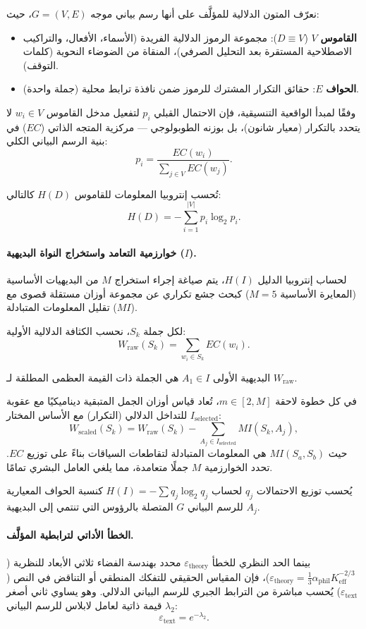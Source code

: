 \documentclass[11pt,a4paper]{article}
\begin{document}
	نعرّف المتون الدلالية للمؤلَّف على أنها رسم بياني موجه \(G = (V, E)\)، حيث:
	\begin{itemize}
		\item \textbf{القاموس} \(V\) (\(D \equiv V\)): مجموعة الرموز الدلالية الفريدة (الأسماء، الأفعال، والتراكيب الاصطلاحية المستقرة بعد التحليل الصرفي)، المنقاة من الضوضاء النحوية (كلمات التوقف).
		\item \textbf{الحواف} \(E\): حقائق التكرار المشترك للرموز ضمن نافذة ترابط محلية (جملة واحدة).
	\end{itemize}
	
	وفقًا لمبدأ الواقعية التنسيقية، فإن الاحتمال القبلي \(p_i\) لتفعيل مدخل القاموس \(w_i \in V\) لا يتحدد بالتكرار (معيار شانون)، بل بوزنه الطوبولوجي — مركزية المتجه الذاتي (\(EC\)) في بنية الرسم البياني الكلي:
	\[
	p_{i} = \frac{EC(w_{i})}{\sum_{j \in V} EC(w_{j})}.
	\]
	
	تُحسب إنتروبيا المعلومات للقاموس \(H(D)\) كالتالي:
	\[
	H(D) = -\sum_{i=1}^{|V|} p_{i} \log_{2} p_{i}.
	\]
	
	\paragraph{خوارزمية التعامد واستخراج النواة البديهية (\(I\)).}
	لحساب إنتروبيا الدليل \(H(I)\)، يتم صياغة إجراء استخراج \(M\) من البديهيات الأساسية (المعايرة الأساسية \(M = 5\)) كبحث جشع تكراري عن مجموعة أوزان مستقلة قصوى مع تقليل المعلومات المتبادلة (\(MI\)).
	
	لكل جملة \(S_{k}\)، نحسب الكثافة الدلالية الأولية:
	\[
	W_{\text{raw}}(S_k) = \sum_{w_i \in S_k} EC(w_i).
	\]
	
	البديهية الأولى \(A_1 \in I\) هي الجملة ذات القيمة العظمى المطلقة لـ \(W_{\text{raw}}\).
	
	في كل خطوة لاحقة \(m \in [2, M]\)، تُعاد قياس أوزان الجمل المتبقية ديناميكيًا مع عقوبة للتداخل الدلالي (التكرار) مع الأساس المختار \(I_{\text{selected}}\):
	\[
	W_{\text{scaled}}(S_{k}) = W_{\text{raw}}(S_{k}) - \sum_{A_{j} \in I_{\text{selected}}} MI(S_{k}, A_{j}),
	\]
	حيث \(MI(S_a, S_b)\) هي المعلومات المتبادلة لتقاطعات السياقات بناءً على توزيع \(EC\). تحدد الخوارزمية \(M\) جملًا متعامدة، مما يلغي العامل البشري تمامًا.
	
	يُحسب توزيع الاحتمالات \(q_{j}\) لحساب \(H(I) = -\sum q_j \log_2 q_j\) كنسبة الحواف المعيارية للرسم البياني \(G\) المتصلة بالرؤوس التي تنتمي إلى البديهية \(A_{j}\).
	
	\paragraph{الخطأ الأداتي لترابطية المؤلَّف.}
	بينما الحد النظري للخطأ \(\varepsilon_{\text{theory}}\) محدد بهندسة الفضاء ثلاثي الأبعاد للنظرية (\(\varepsilon_{\text{theory}} = \frac{1}{3} \alpha_{\text{phil}} K_{\text{eff}}^{-2/3}\))، فإن المقياس الحقيقي للتفكك المنطقي أو التناقض في النص (\(\varepsilon_{\text{text}}\)) يُحسب مباشرة من الترابط الجبري للرسم البياني الدلالي. وهو يساوي ثاني أصغر قيمة ذاتية لعامل لابلاس للرسم البياني \(\lambda_{2}\):
	\[
	\varepsilon_{\text{text}} = e^{-\lambda_{2}}.
	\]
	
\end{document}
